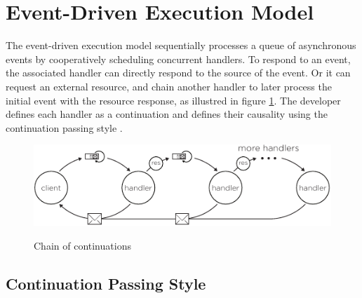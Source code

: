 
\section{Event-Driven Execution Model} \label{chapter4:event-driven}

The event-driven execution model sequentially processes a queue of asynchronous events by cooperatively scheduling concurrent handlers.
To respond to an event, the associated handler can directly respond to the source of the event.
Or it can request an external resource, and chain another handler to later process the initial event with the resource response, as illustred in figure \ref{fig:cont-chain}.
The developer defines each handler as a continuation and defines their causality using the continuation passing style \cite{Wand1980,Haynes1984}.

\begin{figure}[h!]
  \centering
  \includegraphics[width=\linewidth]{../resources/cont-chain.pdf}
  \label{fig:cont-chain}
  \caption{Chain of continuations}
\end{figure}

\subsection{Continuation Passing Style} \label{chapter4:event-loop:continuation}



